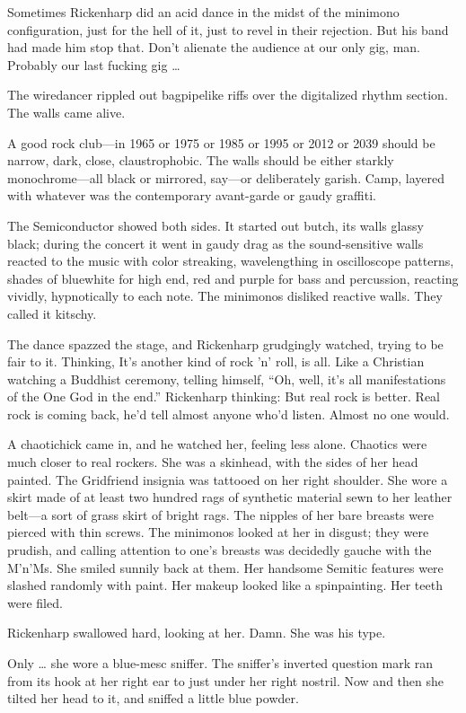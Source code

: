 Sometimes Rickenharp did an acid dance in the midst of the minimono configuration, just for the hell of it, just to revel in their rejection. But his band had made him stop that. Don’t alienate the audience at our only gig, man. Probably our last fucking gig …

The wiredancer rippled out bagpipelike riffs over the digitalized rhythm section. The walls came alive.

A good rock club—in 1965 or 1975 or 1985 or 1995 or 2012 or 2039 should be narrow, dark, close, claustrophobic. The walls should be either starkly monochrome—all black or mirrored, say—or deliberately garish. Camp, layered with whatever was the contemporary avant-garde or gaudy graffiti.

The Semiconductor showed both sides. It started out butch, its walls glassy black; during the concert it went in gaudy drag as the sound-sensitive walls reacted to the music with color streaking, wavelengthing in oscilloscope patterns, shades of bluewhite for high end, red and purple for bass and percussion, reacting vividly, hypnotically to each note. The minimonos disliked reactive walls. They called it kitschy.

The dance spazzed the stage, and Rickenharp grudgingly watched, trying to be fair to it. Thinking, It’s another kind of rock ’n’ roll, is all. Like a Christian watching a Buddhist ceremony, telling himself, “Oh, well, it’s all manifestations of the One God in the end.” Rickenharp thinking: But real rock is better. Real rock is coming back, he’d tell almost anyone who’d listen. Almost no one would.

A chaotichick came in, and he watched her, feeling less alone. Chaotics were much closer to real rockers. She was a skinhead, with the sides of her head painted. The Gridfriend insignia was tattooed on her right shoulder. She wore a skirt made of at least two hundred rags of synthetic material sewn to her leather belt—a sort of grass skirt of bright rags. The nipples of her bare breasts were pierced with thin screws. The minimonos looked at her in disgust; they were prudish, and calling attention to one’s breasts was decidedly gauche with the M’n’Ms. She smiled sunnily back at them. Her handsome Semitic features were slashed randomly with paint. Her makeup looked like a spinpainting. Her teeth were filed.

Rickenharp swallowed hard, looking at her. Damn. She was his type.

Only … she wore a blue-mesc sniffer. The sniffer’s inverted question mark ran from its hook at her right ear to just under her right nostril. Now and then she tilted her head to it, and sniffed a little blue powder.

